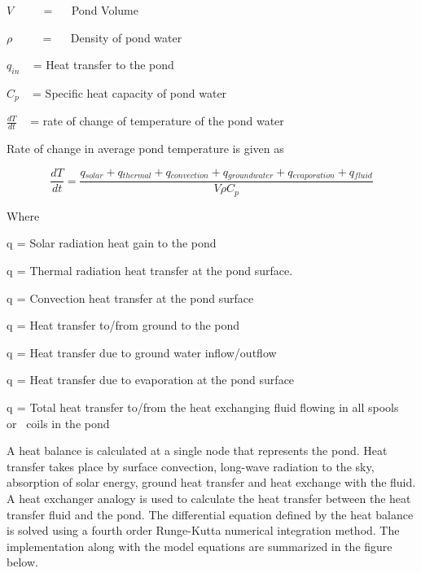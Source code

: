 \(V\) ~~~~ = ~~ Pond Volume

\(\rho\) ~~~~ = ~~ Density of pond water

\({q_{in}}\) ~ = Heat transfer to the pond

\(C{}_p\) ~ = Specific heat capacity of pond water

\(\frac{{dT}}{{dt}}\) ~ = rate of change of temperature of the pond water

Rate of change in average pond temperature is given as

\begin{equation}
\frac{{dT}}{{dt}} = \frac{{q{}_{solar} + q{}_{thermal} + q{}_{convection} + q{}_{groundwater} + q{}_{evaporation} + q{}_{fluid}}}{{V\rho C{}_p}}
\end{equation}

Where

q\(_{ }\) = Solar radiation heat gain to the pond

q\(_{ }\) = Thermal radiation heat transfer at the pond surface.

q\(_{ }\) = Convection heat transfer at the pond surface

q\(_{ }\) = Heat transfer to/from ground to the pond

q\(_{ }\) = Heat transfer due to ground water inflow/outflow

q\(_{ }\) = Heat transfer due to evaporation at the pond surface

q\(_{ }\) = Total heat transfer to/from the heat exchanging fluid flowing in all spools or~ coils in the pond

A heat balance is calculated at a single node that represents the pond. Heat transfer takes place by surface convection, long-wave radiation to the sky, absorption of solar energy, ground heat transfer and heat exchange with the fluid. A heat exchanger analogy is used to calculate the heat transfer between the heat transfer fluid and the pond. The differential equation defined by the heat balance is solved using a fourth order Runge-Kutta numerical integration method. The implementation along with the model equations are summarized in the figure below.


